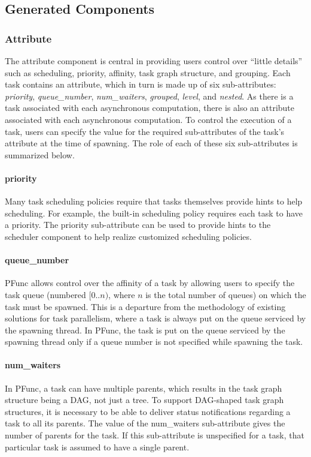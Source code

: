 \subsection{Generated Components}
\label{sec:auto_generated}

\subsubsection{Attribute}
\label{subsubsec:attribute}
%
The attribute component is central in providing users control over ``little
details'' such as scheduling, priority, affinity, task graph structure, and
grouping.
%
Each task contains an attribute, which in turn is made up of six
sub-attributes: \emph{priority}, \emph{queue\_number}, \emph{num\_waiters},
\emph{grouped}, \emph{level}, and \emph{nested}.
%
As there is a task associated with each asynchronous computation, there is also
an attribute associated with each asynchronous computation.
%
To control the execution of a task, users can specify the value for the
required sub-attributes of the task's attribute at the time of spawning.
%
The role of each of these six sub-attributes is summarized below.

\paragraph{priority} Many task scheduling policies require that tasks 
themselves provide hints to help scheduling.
%
For example, the built-in  scheduling policy requires each task to
have a priority.
%
The priority sub-attribute can be used to provide hints to the scheduler
component to help realize customized scheduling policies.
 
\paragraph{queue\_number} PFunc allows control over the affinity of a task
by allowing users to specify the task queue (numbered $[0..n)$, where $n$ is 
the total number of queues) on which the task must be spawned.
%
This is a departure from the methodology of existing solutions for task
parallelism, where a task is always put on the queue serviced by the spawning
thread. 
%
In PFunc, the task is put on the queue serviced by the spawning thread only
if a queue number is not specified while spawning the task.
 
\paragraph{num\_waiters} In PFunc, a task can have multiple parents, which 
results in the task graph structure being a DAG, not just a tree.
%
To support DAG-shaped task graph structures, it is necessary to be able to 
deliver status notifications regarding a task to all its parents.
%
The value of the num\_waiters sub-attribute gives the number of parents for the
task.
%
If this sub-attribute is unspecified for a task, that particular task is
assumed to have a single parent.
 

